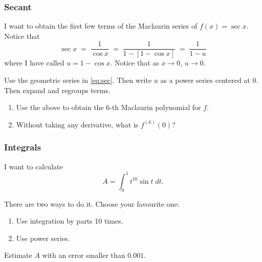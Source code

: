 \documentclass[14pt]{beamer}
\newcommand{\p}{\pause}
\newcommand{\setsize}[1]{\fontsize{#1}{#1}\selectfont} %
\newcommand{\smallerfont}{\setsize{13}} %
\newcommand{\vv}{\vspace{.5cm}}
\newcommand{\vvv}{\vspace{.2cm}}
\begin{document}
	\begin{frame}[t]
		\smallerfont
		\frametitle{Secant}

		I want to obtain the first few terms of the Maclaurin series of
		${\displaystyle f(x) = \sec x}$. Notice that
		\begin{equation}
			\label{eq:sec}\sec x \; = \; \frac{1}{\cos x}\; = \; \frac{1}{1 - \left[ 1
			- \cos x\right]}\; = \; \frac{1}{1-u}
		\end{equation}
		where I have called ${\displaystyle u = 1 - \cos x}$. \; Notice that as
		$x \to 0$, $u \to 0$. \vvv

		Use the geometric series in \eqref{eq:sec}. Then write $u$ as a power series
		centered at 0. Then expand and regroups terms. \vv

		\begin{enumerate}
			\item Use the above to obtain the 6-th Maclaurin polynomial for $f$. \p

			\item Without taking any derivative, what is ${\displaystyle f^{(6)}(0)}$?
		\end{enumerate}
	\end{frame}
	\begin{frame}[t]
		\frametitle{Integrals}

		I want to calculate
		\[
			A = \int_{0}^{1} t^{10}\sin t \; dt.
		\]

		There are two ways to do it. Choose your favourite one:
		\begin{enumerate}
			\item Use integration by parts 10 times.

			\item Use power series.
		\end{enumerate}
		\p \hrulefill \vv

		Estimate $A$ with an error smaller than $0.001$.
	\end{frame}
\end{document}
